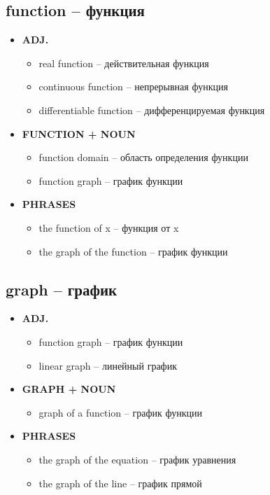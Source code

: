 \documentclass[a4paper, 10pt]{article}
\theoremstyle{definition}
\theoremstyle{plain}
\theoremstyle{remark}
\begin{document}
\subsection{function – функция}

\begin{itemize}
    \item \textbf{ADJ.}
    \begin{itemize}
        \item real function – действительная функция
        \item continuous function – непрерывная функция
        \item differentiable function – дифференцируемая функция
    \end{itemize}
    
    \item \textbf{FUNCTION + NOUN}
    \begin{itemize}
        \item function domain – область определения функции
        \item function graph – график функции
    \end{itemize}
    
    \item \textbf{PHRASES}
    \begin{itemize}
        \item the function of x – функция от x
        \item the graph of the function – график функции
    \end{itemize}
\end{itemize}

\subsection{graph – график}

\begin{itemize}
    \item \textbf{ADJ.}
    \begin{itemize}
        \item function graph – график функции
        \item linear graph – линейный график
    \end{itemize}
    
    \item \textbf{GRAPH + NOUN}
    \begin{itemize}
        \item graph of a function – график функции
    \end{itemize}
    
    \item \textbf{PHRASES}
    \begin{itemize}
        \item the graph of the equation – график уравнения
        \item the graph of the line – график прямой
    \end{itemize}
\end{itemize}
\end{document}
